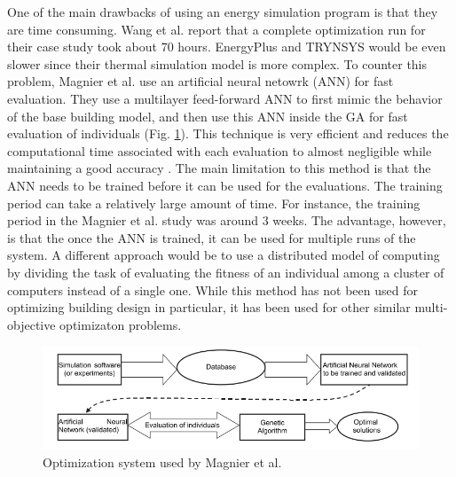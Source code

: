 One of the main drawbacks of using an energy simulation program is that they are time consuming. Wang et al. report that a complete optimization run for their case study took about 70 hours. EnergyPlus and TRYNSYS would be even slower since their thermal simulation model is more complex. To counter this problem, Magnier et al. use an artificial neural netowrk (ANN) for fast evaluation. They use a multilayer feed-forward ANN to first mimic the behavior of the base building model, and then use this ANN inside the GA for fast evaluation of individuals (Fig. \ref{fig:magnier}). This technique is very efficient and reduces the computational time associated with each evaluation to almost negligible while maintaining a good accuracy \cite{Magnier2010}. The main limitation to this method is that the ANN needs to be trained before it can be used for the evaluations. The training period can take a relatively large amount of time. For instance, the training period in the Magnier et al. study was around 3 weeks. The advantage, however, is that the once the ANN is trained, it can be used for multiple runs of the system. A different approach would be to use a distributed model of computing by dividing the task of evaluating the fitness of an individual among a cluster of computers instead of a single one. While this method has not been used for optimizing building design in particular, it has been used for other similar multi-objective optimizaton problems. 


\begin{figure}[htbp]
\centering
\includegraphics[width = \linewidth]{images/magnier.png}
\caption{Optimization system used by Magnier et al. \cite{Magnier2010}}
\label{fig:magnier}
\end{figure}



